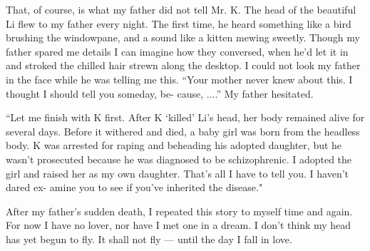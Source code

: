 \documentclass[a6paper]{article}
\begin{document}
That, of course, is what my father did not tell Mr. K.  The
head of the beautiful Li ﬂew to my father every night.  The
ﬁrst time, he heard something like a bird brushing the
windowpane, and a sound like a kitten mewing sweetly.
Though my father spared me details I can imagine how they
conversed, when he'd let it in and stroked the chilled hair
strewn along the desktop.  I could not look my father in the
face while he was telling me this.  “Your mother never knew
about this.  I thought I should tell you someday, be-
cause, ....” My father hesitated.

“Let me finish with K first.  After K `killed' Li's head,
her body remained alive for several days.  Before it withered
and died, a baby girl was born from the headless body.  K
was arrested for raping and beheading his adopted daughter,
but he wasn't prosecuted because he was diagnosed to be
schizophrenic.  I adopted the girl and raised her as my own
daughter.  That's all I have to tell you.  I haven't dared ex-
amine you to see if you've inherited the disease."

After my father's sudden death, I repeated this story to
myself time and again.  For now I have no lover, nor have I
met one in a dream.  I don't think my head has yet begun to
ﬂy.  It shall not ﬂy --- until the day I fall in love.
\end{document}
